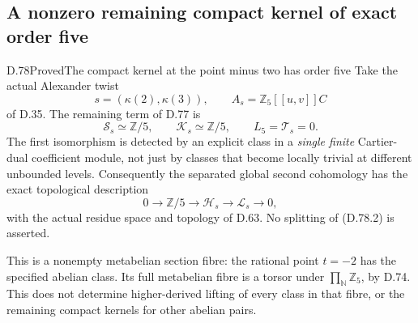 \subsection{A nonzero remaining compact kernel of exact order five}

\begin{statement}{D.78}{Proved}{The compact kernel at the point minus two has order five}
Take the actual Alexander twist
\[
 s=(\kappa(2),\kappa(3)),\qquad A_s=\mathbb Z_5[[u,v]]C
\]
of D.35. The remaining term of D.77 is
\[
 \mathcal S_s\simeq\mathbb Z/5,\qquad
 \mathcal K_s\simeq\mathbb Z/5,\qquad L_5=\mathcal T_s=0.
                                                               \tag{D.78.1}
\]
The first isomorphism is detected by an explicit class in a
\emph{single finite} Cartier-dual coefficient module, not just by
classes that become locally trivial at different unbounded levels.
Consequently the separated global second cohomology has the exact
topological description
\[
 0\longrightarrow\mathbb Z/5\longrightarrow\mathcal H_s
       \longrightarrow\mathcal L_s\longrightarrow0,     \tag{D.78.2}
\]
with the actual residue space and topology of D.63. No splitting
of (D.78.2) is asserted.

This is a nonempty metabelian section fibre: the rational point
\(t=-2\) has the specified abelian class. Its full metabelian
fibre is a torsor under \(\prod_{\mathbb N}\mathbb Z_5\), by D.74.
This does not determine higher-derived lifting of every
class in that fibre, or the remaining compact kernels for other
abelian pairs.
\end{statement}

